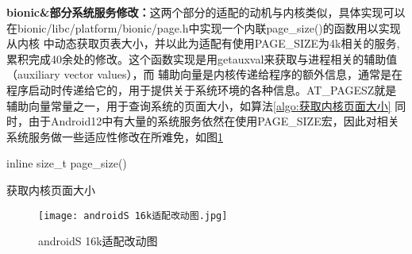 \textbf{bionic\&部分系统服务修改：}这两个部分的适配的动机与内核类似，具体实现可以在bionic/libc/platform/bionic/page.h中实现一个内联page\_size()的函数用以实现从内核
中动态获取页表大小，并以此为适配有使用PAGE\_SIZE为4k相关的服务,累积完成40余处的修改。这个函数实现是用getauxval来获取与进程相关的辅助值（auxiliary vector values），而
辅助向量是内核传递给程序的额外信息，通常是在程序启动时传递给它的，用于提供关于系统环境的各种信息。AT\_PAGESZ就是辅助向量常量之一，用于查询系统的页面大小，如算法\ref{algo:获取内核页面大小}
同时，由于Android12中有大量的系统服务依然在使用PAGE\_SIZE宏，因此对相关系统服务做一些适应性修改在所难免，如图\ref{fig:androidS 16k适配改动图}
\begin{algorithm}[H]
  \SetAlgoLined
  inline size\_t page\_size(){\\
  }
  \caption{获取内核页面大小}
  \label{algo:获取内核页面大小}
\end{algorithm}

\begin{figure}[h]
  \centering
  \texttt{[image: androidS 16k适配改动图.jpg]}
  \caption{androidS 16k适配改动图}
  \label{fig:androidS 16k适配改动图}
\end{figure}








